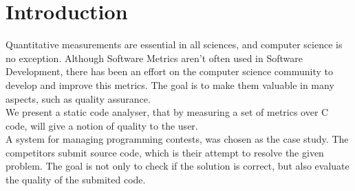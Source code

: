 \section{Introduction}
Quantitative measurements are essential in all sciences, and computer science is no exception.
Although Software Metrics aren't often used in Software Development, there has been an effort on the computer science community to develop and improve this metrics. 
The goal is to make them valuable in many aspects, such as quality assurance.\\
We present a static code analyser, that by measuring a set of metrics over C code, will give a notion of quality to the user.\\
A system for managing programming contests, was chosen as the case study.
The competitors submit source code, which is their attempt to resolve the given problem.
The goal is not only to check if the solution is correct, but also evaluate the quality of the submited code.


